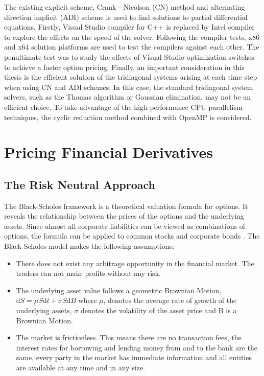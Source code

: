 \documentclass[12pt, oneside]{book}
\theoremstyle{plain}
\theoremstyle{definition}
\begin{document}
The existing explicit scheme, Crank - Nicolson (CN) method and alternating direction implicit (ADI) scheme is used to find solutions to partial differential equations. Firstly, Visual Studio compiler for C++ is replaced by Intel compiler to explore the effects on the speed of the solver. Following the compiler tests, x86 and x64 solution platforms are used to test the compilers against each other. The penultimate test was to study the effects of Visual Studio optimization switches to achieve a faster option pricing. Finally, an important consideration in this thesis is the efficient solution of the tridiagonal systems arising at each time step when using CN and ADI schemes. In this case, the standard tridiagonal system solvers, such as the Thomas algorithm or Gaussian elimination, may not be an efficient choice. To take advantage of the high-performance CPU parallelism techniques, the cyclic reduction method combined with OpenMP is considered.

\chapter{Pricing Financial Derivatives}\label{Pricing Financial Derivatives}
\section{The Risk Neutral Approach}
The Black-Scholes framework is a theoretical valuation formula for options. It reveals the relationship between the prices of the options and the underlying assets. Since almost all corporate liabilities can be viewed as combinations of options, the formula can be applied to common stocks and corporate bonds \cite{BS}. The Black-Scholes model makes the following assumptions:
\begin{itemize}
\item There does not exist any arbitrage opportunity in the financial market.  The traders can not make profits without any risk.
\item The underlying asset value follows a geometric Brownian Motion, $\mathrm{d}S = \mu S \mathrm{d}t + \sigma S \mathrm{d}B $ where $\mu$, denotes the average rate of growth of the underlying assets, $\sigma$ denotes the volatility of the asset price and B is a Brownian Motion.
\item The market is frictionless.  This means there are no transaction fees, the interest rates for borrowing and lending money from and to the bank are the same, every party in the market has immediate information and all entities are available at any time and in any size.
\end{itemize}
\end{document}
